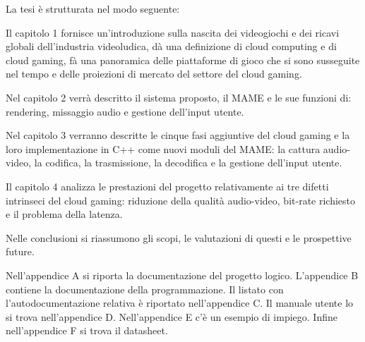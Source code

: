 La tesi è strutturata nel modo seguente:
\begin{description}
	\item Il capitolo 1 fornisce un'introduzione sulla nascita dei videogiochi e dei ricavi globali dell'industria videoludica, dà una definizione di cloud computing e di cloud gaming, fà una panoramica delle piattaforme di gioco che si sono susseguite nel tempo e delle proiezioni di mercato del settore del cloud gaming.
	\item Nel capitolo 2 verrà descritto il sistema proposto, il MAME e le sue funzioni di: rendering, missaggio audio e gestione dell'input utente.
	\item Nel capitolo 3 verranno descritte le cinque fasi aggiuntive del cloud gaming e la loro implementazione in C++ come nuovi moduli del MAME: la cattura audio-video, la codifica, la trasmissione, la decodifica e la gestione dell'input utente.
	\item Il capitolo 4 analizza le prestazioni del progetto relativamente ai tre difetti intrinseci del cloud gaming: riduzione della qualità audio-video, bit-rate richiesto e il problema della latenza.
	\item Nelle conclusioni si riassumono gli scopi, le valutazioni di questi e le prospettive future.
	\item Nell'appendice A si riporta la documentazione del progetto logico. L'appendice B contiene la documentazione della programmazione. Il listato con l’autodocumentazione relativa è riportato nell'appendice C. Il manuale utente lo si trova nell'appendice D. Nell'appendice E c'è un esempio di impiego. Infine nell'appendice F si trova il datasheet.
\end{description}